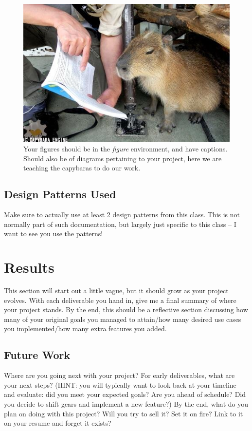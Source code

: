 \documentclass[10pt,conference,onecolumn,compsoc]{IEEEtran}
\begin{document}
\begin{figure}[ht!]
\includegraphics[scale=1]{capybara2.jpg}
\caption{Your figures should be in the \emph{figure} environment, and have captions.  Should also be of diagrams pertaining to your project, here we are teaching the capybaras to do our work.}
\label{capybara2}
\end{figure}


\subsection{Design Patterns Used}
Make sure to actually use at least 2 design patterns from this class.  This is not normally part of such documentation, but largely just specific to this class -- I want to see you use the patterns!



\section{Results}
This section will start out a little vague, but it should grow as your project evolves.  With each deliverable you hand in, give me a final summary of where your project stands.  By the end, this should be a reflective section discussing how many of your original goals you managed to attain/how many desired use cases you implemented/how many extra features you added.

\subsection{Future Work}
Where are you going next with your project?
For early deliverables, what are your next steps?  (HINT: you will typically want to look back at your timeline and evaluate: did you meet your expected goals?  Are you ahead of schedule?  Did you decide to shift gears and implement a new feature?)
By the end, what do you plan on doing with this project?  Will you try to sell it?  Set it on fire?  Link to it on your resume and forget it exists?
\end{document}
